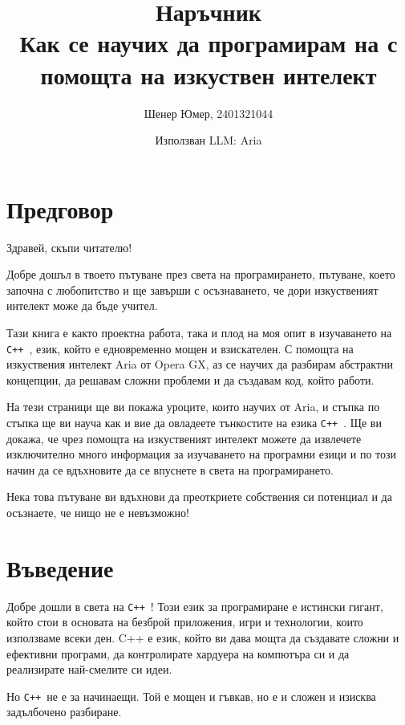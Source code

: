 \documentclass[oneside]{book}
\title{Наръчник\\Как се научих да програмирам на \cpp
с помощта на изкуствен интелект}
\author{Шенер Юмер, 2401321044}
\date{Използван LLM: Aria}
\newcommand*{\cpp}{\texttt{C++}\ }
\begin{document}
\maketitle
\tableofcontents
\newpage

\chapter*{Предговор}
Здравей, скъпи читателю!

Добре дошъл в твоето пътуване през света на програмирането, пътуване,
което започна с любопитство и ще завърши с осъзнаването, че дори изкуственият
интелект може да бъде учител.

Тази книга е както проектна работа, така и плод на моя опит в изучаването на \cpp,
език, който е едновременно мощен и взискателен. С помощта на изкуствения интелект
Aria от Opera GX, аз се научих да разбирам абстрактни концепции, да решавам сложни
проблеми и да създавам код, който работи.

На тези страници ще ви покажа уроците, които научих от Aria, и стъпка по стъпка ще ви
науча как и вие да овладеете тънкостите на езика \cpp. Ще ви докажа, че чрез помощта на 
изкуственият интелект можете да извлечете изключително много информация за изучаването
на програмни езици и по този начин да се вдъхновите да се впуснете в света
на програмирането.

Нека това пътуване ви вдъхнови да преоткриете собствения си потенциал
и да осъзнаете, че нищо не е невъзможно!

\chapter{Въведение}
Добре дошли в света на \cpp! Този език за програмиране е истински гигант, който стои в основата на безброй приложения, игри и технологии, които използваме всеки ден. C++ е език, който ви дава мощта да създавате сложни и ефективни програми, да контролирате хардуера на компютъра си и да реализирате най-смелите си идеи. 

Но \cpp не е за начинаещи. Той е мощен и гъвкав, но е и сложен и изисква задълбочено разбиране.  
\end{document}
